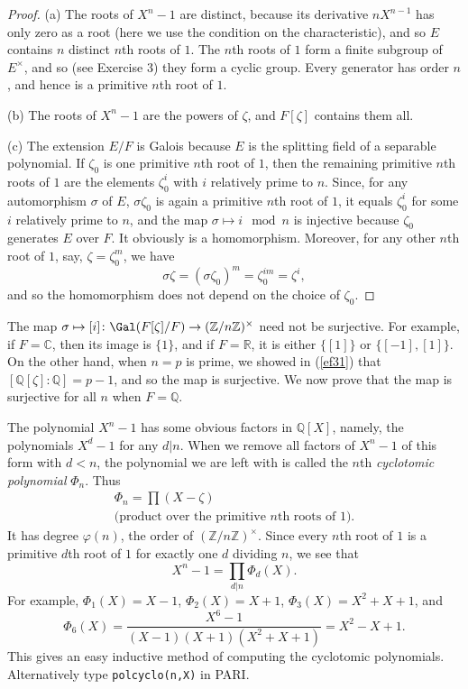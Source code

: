 \documentclass[a4paper,11pt,final,openany]{memoir}
\theoremstyle{nonumberplain}
\newtheorem{proof}{Proof.}
\begin{document}
\begin{proof}
(a) The roots of $X^{n}-1$ are distinct, because its derivative $nX^{n-1}$ has
only zero as a root (here we use the condition on the characteristic), and so
$E$ contains $n$ distinct $n$th roots of $1$. The $n$th roots of $1$ form a
finite subgroup of $E^{\times}$, and so (see Exercise 3) they form a cyclic
group. Every generator has order $n$, and hence is a primitive $n$th root of
$1$.

(b) The roots of $X^{n}-1$ are the powers of $\zeta$, and $F[\zeta]$ contains
them all.

(c) The extension $E/F$ is Galois because $E$ is the splitting field of a
separable polynomial. If $\zeta_{0}$ is one primitive $n$th root of $1$, then
the remaining primitive $n$th roots of $1$ are the elements $\zeta_{0}^{i}$
with $i$ relatively prime to $n$. Since, for any automorphism $\sigma$ of $E$,
$\sigma\zeta_{0}$ is again a primitive $n$th root of $1$, it equals $\zeta
_{0}^{i}$ for some $i$ relatively prime to $n$, and the map $\sigma\mapsto
i\mod n$ is injective because $\zeta_{0}$ generates $E$ over $F$. It obviously
is a homomorphism. Moreover, for any other $n$th root of $1$, say,
$\zeta=\zeta_{0}^{m}$, we have
\[
\sigma\zeta=(\sigma\zeta_{0})^{m}=\zeta_{0}^{im}=\zeta^{i},
\]
and so the homomorphism does not depend on the choice of $\zeta_{0}$.
\end{proof}

The map $\sigma\mapsto\lbrack i]\colon\Gal(F[\zeta]/F)\rightarrow
(\mathbb{Z}/n\mathbb{Z})^{\times}$ need not be surjective. For example, if
$F=\mathbb{C}$, then its image is $\{1\}$, and if $F=\mathbb{R}$, it is either
$\{[1]\}$ or $\{[-1],[1]\}$. On the other hand, when $n=p$ is prime, we showed
in (\ref{ef31}) that $[\mathbb{Q}[\zeta]\colon\mathbb{Q}]=p-1$, and so the map
is surjective. We now prove that the map is surjective for all $n$ when
$F=\mathbb{Q}$.

The polynomial $X^{n}-1$ has some obvious factors in $\mathbb{Q}[X]$, namely,
the polynomials $X^{d}-1$ for any $d|n$. When we remove all factors of
$X^{n}-1$ of this form with $d<n$, the polynomial we are left with is called
the $n$th \emph{cyclotomic polynomial}%
$\Phi_{n}$. Thus
\begin{align*}
\Phi_{n}=\prod(X-\zeta)\\
\text{(product over the primitive }n{\text{th}%
}\text{\ roots of }1).
\end{align*}
It has degree%
$\varphi(n)$, the order of $(\mathbb{Z}/n\mathbb{Z})^{\times}$. Since every
$n$th root of $1$ is a primitive $d$th root of $1$ for exactly one $d$
dividing $n$, we see that
\[
X^{n}-1=\prod_{d|n}\Phi_{d}(X).
\]
For example, $\Phi_{1}(X)=X-1$, $\Phi_{2}(X)=X+1$, $\Phi_{3}(X)=X^{2}+X+1$,
and
\[
\Phi_{6}(X)=\frac{X^{6}-1}{(X-1)(X+1)(X^{2}+X+1)}=X^{2}-X+1.
\]
This gives an easy inductive method of computing the cyclotomic polynomials.
Alternatively type
%
\texttt{polcyclo(n,X)} in PARI.
\end{document}
